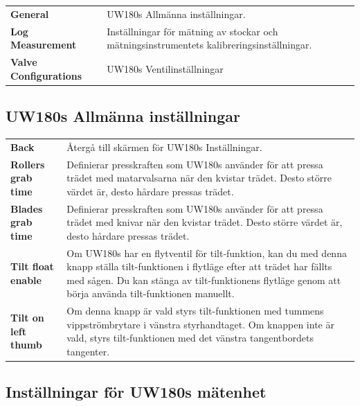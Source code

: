 \documentclass[12pt,a4paper,finnish]{uvmanual}
\begin{document}

\begin{tabular}{ L{0.2\textwidth} L{0.66\textwidth} }
\textbf{General} & UW180s Allmänna inställningar. \\
\textbf{Log Measurement} & Inställningar för mätning av stockar och mätningsinstrumentets kalibreringsinställningar. \\
\textbf{Valve Configurations} & UW180s Ventilinställningar 
\end{tabular}

\FloatBarrier
\subsection{UW180s Allmänna inställningar}\label{ch:settings_uw180s_meas}


\begin{tabular}{ L{0.2\textwidth} L{0.66\textwidth} }
\textbf{Back} & Återgå till skärmen för UW180s Inställningar. \\
\textbf{Rollers grab time} & Definierar presskraften som UW180s använder för att pressa trädet med matarvalsarna när den kvistar trädet. Desto större värdet är, desto hårdare pressas trädet. \\
\textbf{Blades grab time} & Definierar presskraften som UW180s använder för att pressa trädet med knivar när den kvistar trädet. Desto större värdet är, desto hårdare pressas trädet.  \\
\textbf{Tilt float enable} & Om UW180s har en flytventil för tilt-funktion, kan du med denna knapp ställa tilt-funktionen i flytläge efter att trädet har fällts med sågen.  Du kan stänga av tilt-funktionens flytläge genom att börja använda tilt-funktionen manuellt.  \\
\textbf{Tilt on left thumb} & Om denna knapp är vald styrs tilt-funktionen med tummens vippströmbrytare i vänstra styrhandtaget.  Om knappen inte är vald, styrs tilt-funktionen med det vänstra tangentbordets tangenter.  \\
\end{tabular}

\FloatBarrier
\subsection{Inställningar för UW180s mätenhet}\label{ch:settings_uw180s_meas}
\end{document}
